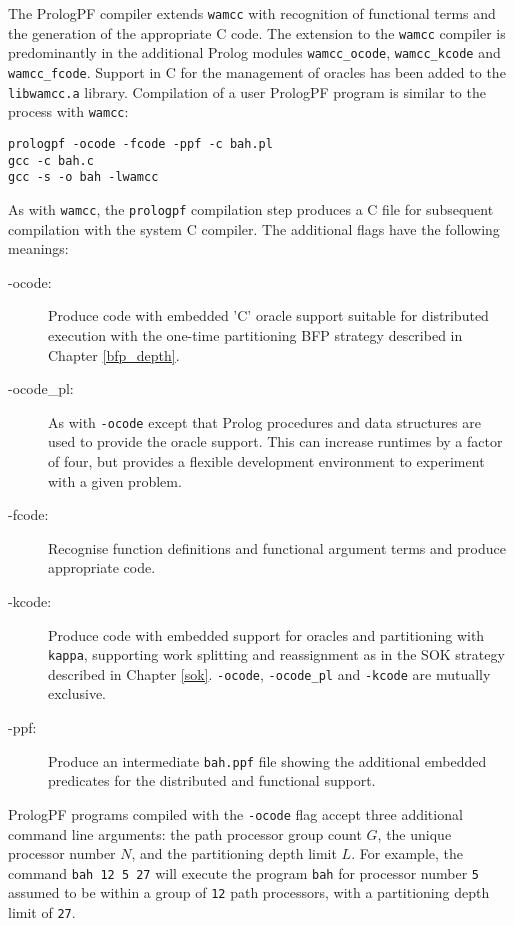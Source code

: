 The PrologPF compiler extends \texttt{wamcc} with recognition of functional terms
and the generation of the appropriate C code.  The extension to the
\texttt{wamcc} compiler is predominantly in the additional Prolog modules
\texttt{wamcc\_{}ocode}, \texttt{wamcc\_{}kcode}
and \texttt{wamcc\_{}fcode}.  Support in C for the management of
oracles has been added to the \texttt{libwamcc.a} library.  Compilation of a user
PrologPF program is similar to the process with \texttt{wamcc}:
\begin{verbatim}
prologpf -ocode -fcode -ppf -c bah.pl
gcc -c bah.c
gcc -s -o bah -lwamcc
\end{verbatim}
As with \texttt{wamcc}, the \texttt{prologpf} compilation step produces a C
file for subsequent compilation with the system C compiler.
The additional flags have the following meanings:
\begin{description}
\item[-ocode: ]{Produce code with embedded 'C' oracle support suitable for distributed
  execution with the one-time partitioning BFP strategy described in Chapter \ref{bfp_depth}.}
\item[-ocode\_{}pl: ]{As with \texttt{-ocode} except that Prolog procedures and data structures
  are used to provide the oracle support.  This can increase runtimes by a factor of four,
  but provides a flexible development environment to experiment with a given problem.}
\item[-fcode: ]{Recognise function definitions and functional argument terms and
  produce appropriate code.}
\item[-kcode: ]{Produce code with embedded support for oracles and partitioning with
  \texttt{kappa}, supporting work splitting and reassignment as in the SOK strategy
  described in Chapter \ref{sok}. \texttt{-ocode}, \texttt{-ocode\_{}pl}
  and \texttt{-kcode} are mutually exclusive.}
\item[-ppf: ]{Produce an intermediate \texttt{bah.ppf} file showing the additional
  embedded predicates for the distributed and functional support.}
\end{description}

PrologPF programs compiled with the \texttt{-ocode} flag accept three additional
command line arguments: the path processor group count $G$, the unique processor
number $N$, and the partitioning depth limit $L$.  For example, the command
\texttt{bah 12 5 27} will execute the program \texttt{bah} for processor number
\texttt{5} assumed to be within a group of \texttt{12} path processors, with a
partitioning depth limit of \texttt{27}.

